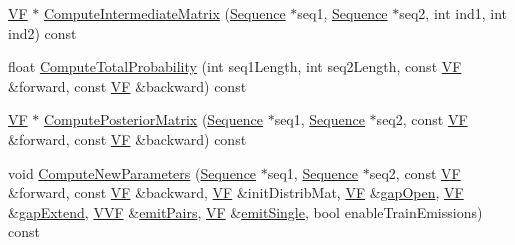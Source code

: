 \begin{DoxyCompactItemize}
\item 
\hyperlink{namespace_p_r_o_b_c_o_n_s_a7d46b91dfef3fa4038545a492ad12221}{V\+F} $\ast$ \hyperlink{class_p_r_o_b_c_o_n_s_1_1_probabilistic_model_a05f8a657309caed13c791eb327abebf4}{Compute\+Intermediate\+Matrix} (\hyperlink{class_p_r_o_b_c_o_n_s_1_1_sequence}{Sequence} $\ast$seq1, \hyperlink{class_p_r_o_b_c_o_n_s_1_1_sequence}{Sequence} $\ast$seq2, int ind1, int ind2) const 
\item 
float \hyperlink{class_p_r_o_b_c_o_n_s_1_1_probabilistic_model_acf67af3c07e223879b13d89e08da3cd1}{Compute\+Total\+Probability} (int seq1\+Length, int seq2\+Length, const \hyperlink{namespace_p_r_o_b_c_o_n_s_a7d46b91dfef3fa4038545a492ad12221}{V\+F} \&forward, const \hyperlink{namespace_p_r_o_b_c_o_n_s_a7d46b91dfef3fa4038545a492ad12221}{V\+F} \&backward) const 
\item 
\hyperlink{namespace_p_r_o_b_c_o_n_s_a7d46b91dfef3fa4038545a492ad12221}{V\+F} $\ast$ \hyperlink{class_p_r_o_b_c_o_n_s_1_1_probabilistic_model_a2b4661797664c99b8b3cd67a50c250ca}{Compute\+Posterior\+Matrix} (\hyperlink{class_p_r_o_b_c_o_n_s_1_1_sequence}{Sequence} $\ast$seq1, \hyperlink{class_p_r_o_b_c_o_n_s_1_1_sequence}{Sequence} $\ast$seq2, const \hyperlink{namespace_p_r_o_b_c_o_n_s_a7d46b91dfef3fa4038545a492ad12221}{V\+F} \&forward, const \hyperlink{namespace_p_r_o_b_c_o_n_s_a7d46b91dfef3fa4038545a492ad12221}{V\+F} \&backward) const 
\item 
void \hyperlink{class_p_r_o_b_c_o_n_s_1_1_probabilistic_model_a551adb86abad67818abf72f514e18a95}{Compute\+New\+Parameters} (\hyperlink{class_p_r_o_b_c_o_n_s_1_1_sequence}{Sequence} $\ast$seq1, \hyperlink{class_p_r_o_b_c_o_n_s_1_1_sequence}{Sequence} $\ast$seq2, const \hyperlink{namespace_p_r_o_b_c_o_n_s_a7d46b91dfef3fa4038545a492ad12221}{V\+F} \&forward, const \hyperlink{namespace_p_r_o_b_c_o_n_s_a7d46b91dfef3fa4038545a492ad12221}{V\+F} \&backward, \hyperlink{namespace_p_r_o_b_c_o_n_s_a7d46b91dfef3fa4038545a492ad12221}{V\+F} \&init\+Distrib\+Mat, \hyperlink{namespace_p_r_o_b_c_o_n_s_a7d46b91dfef3fa4038545a492ad12221}{V\+F} \&\hyperlink{namespace_p_r_o_b_c_o_n_s_aad90cbdf21742e0d50a23be886afbffe}{gap\+Open}, \hyperlink{namespace_p_r_o_b_c_o_n_s_a7d46b91dfef3fa4038545a492ad12221}{V\+F} \&\hyperlink{namespace_p_r_o_b_c_o_n_s_ae1d3cf6541679992bb3dc1a89e0347d5}{gap\+Extend}, \hyperlink{namespace_p_r_o_b_c_o_n_s_a64c77882f700f0f6e9426241c7d7ba1c}{V\+V\+F} \&\hyperlink{namespace_p_r_o_b_c_o_n_s_ae28575916501eeab36245ba0624d0640}{emit\+Pairs}, \hyperlink{namespace_p_r_o_b_c_o_n_s_a7d46b91dfef3fa4038545a492ad12221}{V\+F} \&\hyperlink{namespace_p_r_o_b_c_o_n_s_a60ce52cd8ccb26631e13fecca788f13e}{emit\+Single}, bool enable\+Train\+Emissions) const 

\end{DoxyCompactItemize}

